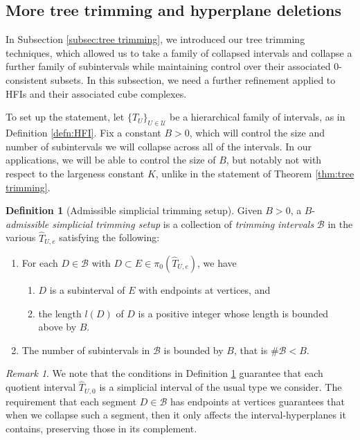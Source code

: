 \documentclass{amsart}
\theoremstyle{definition}
\newtheorem{definition}[theorem]{Definition}
\theoremstyle{remark}
\newtheorem{remark}[theorem]{Remark}
\theoremstyle{definition}
\newcommand{\calB}{\mathcal{B}}
\newcommand{\calU}{\mathcal{U}}
\newcommand{\hT}{\widehat{T}}
\begin{document}
\subsection{More tree trimming and hyperplane deletions}\label{subsec:tt cube}


In Subsection \ref{subsec:tree trimming}, we introduced our tree trimming techniques, which allowed us to take a family of collapsed intervals and collapse a further family of subintervals while maintaining control over their associated $0$-consistent subsets.  In this subsection, we need a further refinement applied to HFIs and their associated cube complexes.

To set up the statement, let $\{\hT_U\}_{U \in \calU}$ be a hierarchical family of intervals, as in Definition \ref{defn:HFI}.  Fix a constant $B>0$, which will control the size and number of subintervals we will collapse across all of the intervals.  In our applications, we will be able to control the size of $B$, but notably not with respect to the largeness constant $K$, unlike in the statement of Theorem \ref{thm:tree trimming}.

\begin{definition}[Admissible simplicial trimming setup]\label{defn:simplicial trimming setup}
Given $B>0$, a $B$-\emph{admissible simplicial trimming setup} is a collection of \emph{trimming intervals} $\calB$ in the various $\hT_{U,e}$ satisfying the following:
\begin{enumerate}
\item For each $D \in \calB$ with $D \subset E \in \pi_0(\hT_{U,e})$, we have \label{item:trimming integer}
\begin{enumerate}
\item $D$ is a subinterval of $E$ with endpoints at vertices, and
\item the length $l(D)$ of $D$ is a positive integer whose length is bounded above by $B$.
\end{enumerate}
\item The number of subintervals in $\calB$ is bounded by $B$, that is $\#\calB < B$.
\end{enumerate}
\end{definition}

\begin{remark}
We note that the conditions in Definition \ref{defn:simplicial trimming setup} guarantee that each quotient interval $\hT_{U,0}$ is a simplicial interval of the usual type we consider.  The requirement that each segment $D \in \calB$ has endpoints at vertices guarantees that when we collapse such a segment, then it only affects the interval-hyperplanes it contains, preserving those in its complement.
\end{remark}
\end{document}
